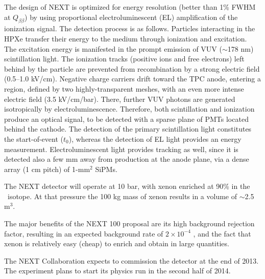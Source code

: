 The design of NEXT is optimized for energy resolution (better than 1\% FWHM at $Q_{\beta \beta}$) by using proportional electroluminescent (EL) amplification of the ionization signal. The detection process is as follows. Particles interacting in the HPXe transfer their energy to the medium through ionization and excitation. The excitation energy is manifested in the prompt emission of VUV ($\sim$178 nm) scintillation light. The ionization tracks (positive ions and free electrons) left behind by the particle are prevented from recombination by a strong electric field (0.5--1.0 kV/cm). Negative charge carriers drift toward the TPC anode, entering a region, defined by two highly-transparent meshes, with an even more intense electric field (3.5 kV/cm/bar). There, further VUV photons are generated isotropically by electroluminescence. Therefore, both scintillation and ionization produce an optical signal, to be detected with a sparse plane of PMTs located behind the cathode. The detection of the primary scintillation light constitutes the start-of-event ($t_0$), whereas the detection of EL light provides an energy measurement. Electroluminescent light provides tracking as well, since it is detected also a few mm away from production at the anode plane, via a dense array (1 cm pitch) of 1-mm$^{2}$ SiPMs.

The NEXT detector will operate at 10 bar, with xenon enriched at 90\% in the \XE\ isotope. At that pressure the 100 kg mass of xenon results in a volume of $\sim$2.5 m$^3$.

The major benefits of the NEXT 100 proposal are its high background rejection factor, resulting in an expected background rate of $2\times 10^{-4}$ \ckkbby , and the fact that xenon is relatively easy (cheap) to enrich and obtain in large quantities.

The NEXT Collaboration expects to commission the detector at the end of 2013. The experiment plans to start its physics run in the second half of 2014.

